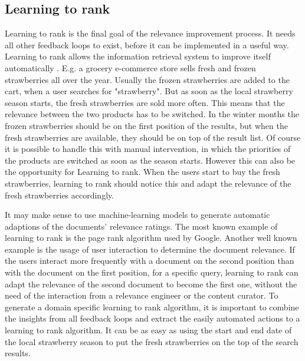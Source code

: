 \subsection{Learning to rank}
\label{ref:qa:orga:l2r}
Learning to rank is the final goal of the relevance improvement process.
It needs all other feedback loops to exist, before it can be implemented in a useful way.
Learning to rank allows the information retrieval system to improve itself automatically \cite[see][P. 276]{relevant_search_2016}.
E.g. a grocery e-commerce store sells fresh and frozen strawberries all over the year.
Usually the frozen strawberries are added to the cart, when a user searches for "strawberry".
But as soon as the local strawberry season starts, the fresh strawberries are sold more often.
This means that the relevance between the two products has to be switched.
In the winter months the frozen strawberries should be on the first position of the results,
but when the fresh strawberries are available, they should be on top of the result list.
Of course it is possible to handle this with manual intervention, 
in which the priorities of the products are switched as soon as the season starts.
However this can also be the opportunity for Learning to rank.
When the users start to buy the fresh strawberries, 
learning to rank should notice this and adapt the relevance of the fresh strawberries accordingly.
\par
It may make sense to use machine-learning models to generate automatic adaptions of the documents' relevance ratings.
The most known example of learning to rank is the page rank algorithm used by Google\cite[see][]{brin_page_1998}.
Another well known example is the usage of user interaction to determine the document relevance.
If the users interact more frequently with a document on the second position than with the document on the first position,
for a specific query, learning to rank can adapt the relevance of the second document to become the first one,
without the need of the interaction from a relevance engineer or the content curator.
To generate a domain specific learning to rank algorithm, it is important to combine the insights from all feedback loops
and extract the easily automated actions to a learning to rank algorithm.
It can be as easy as using the start and end date of the local strawberry season to put the fresh strawberries on the top of the search results.

